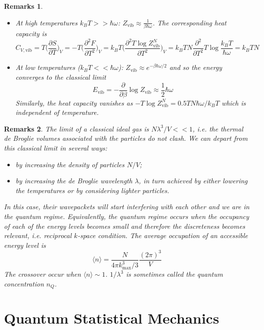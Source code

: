 \documentclass[a4paper]{article}
\newtheorem{remarks}{Remarks}[section]
\theoremstyle{new}
\begin{document}
\begin{remarks}
\begin{itemize}
    \item At high temperatures $k_BT>>\hbar\omega$: $Z_{\text{vib}}\approx\frac{1}{\beta\hbar\omega}$. The corresponding heat capacity is
  $$C_{V,\text{vib}}=T\bigg(\frac{\partial S}{\partial T}\bigg)_V=-T\bigg(\frac{\partial^2F}{\partial T^2}\bigg)_V=k_BT\bigg(\frac{\partial^2T\log Z_{\text{vib}}^N}{\partial T^2}\bigg)_V=k_BTN\frac{\partial^2}{\partial T^2}T\log\frac{k_BT}{\hbar\omega}=k_BTN$$  
  \item At low temperatures ($k_BT<<\hbar\omega$): $Z_{\text{vib}}\approx e^{-\beta\hbar\omega/2}$ and so the energy converges to the classical limit
  $$E_{\text{vib}}=-\frac{\partial}{\partial\beta}\log Z_{\text{vib}}\approx\frac{1}{2}\hbar\omega$$
  Similarly, the heat capacity vanishes as $-T\log Z_{\text{vib}}^N=0.5TN\hbar\omega/k_BT$ which is independent of temperature.
\end{itemize}
\end{remarks}
\begin{remarks}
The limit of a classical ideal gas is $N\lambda^3/V<<1$, i.e. the thermal de Broglie volumes associated with the particles do not clash. We can depart from this classical limit in several ways:
\begin{itemize}
    \item by increasing the density of particles $N/V$;
    \item by increasing the de Broglie wavelength $\lambda$, in turn achieved by either lowering the temperatures or by considering lighter particles.
\end{itemize}
In this case, their wavepackets will start interfering with each other and we are in the quantum regime. Equivalently, the quantum regime occurs when the occupancy of each of the energy levels becomes small and therefore the discreteness becomes relevant, i.e. reciprocal $k$-space condition. The average occupation of an accessible energy level is
$$\langle n\rangle=\frac{N}{4\pi k_{\text{max}}^3/3}\frac{(2\pi)^3}{V}$$
The crossover occur when $\langle n\rangle\sim 1$. $1/\lambda^3$ is sometimes called the quantum concentration $n_Q$.
\end{remarks}
\newpage
\section{Quantum Statistical Mechanics}
\end{document}
